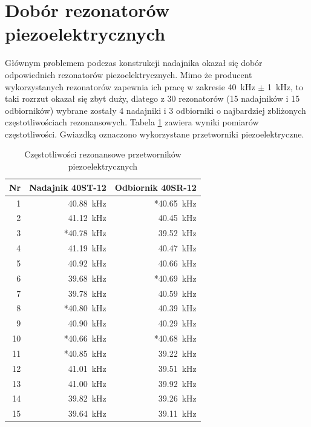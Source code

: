 \section{Dobór rezonatorów piezoelektrycznych}

Głównym problemem podczas konstrukcji nadajnika okazał się dobór odpowiednich rezonatorów piezoelektrycznych.
Mimo że producent wykorzystanych rezonatorów zapewnia ich pracę w zakresie \SI{40}{kHz} $\pm$ \SI{1}{kHz},
to taki rozrzut okazał się zbyt duży, 
dlatego z 30 rezonatorów (15 nadajników i 15 odbiorników) wybrane zostały 4 nadajniki i 3 odbiorniki o najbardziej 
zbliżonych częstotliwościach rezonansowych.
Tabela \ref{table:czestotliwosci} zawiera wyniki pomiarów częstotliwości. Gwiazdką oznaczono wykorzystane przetworniki piezoelektryczne.

\begin{table}[h]
  \caption{Częstotliwości rezonansowe przetworników piezoelektrycznych}
  \smallskip
  \label{table:czestotliwosci}
  \centering
  \begin{tabular}{|r|r|r|}
    \hline 
    Nr & Nadajnik 40ST-12 & Odbiornik 40SR-12\\
    \hline
    1  &   \SI{40,88}{kHz} & *\SI{40,65}{kHz} \\
    2  &   \SI{41,12}{kHz} &  \SI{40,45}{kHz} \\
    3  &  *\SI{40,78}{kHz} &  \SI{39,52}{kHz} \\
    4  &   \SI{41,19}{kHz} &  \SI{40,47}{kHz} \\
    5  &   \SI{40,92}{kHz} &  \SI{40,66}{kHz} \\
    6  &   \SI{39,68}{kHz} & *\SI{40,69}{kHz} \\
    7  &   \SI{39,78}{kHz} &  \SI{40,59}{kHz} \\
    8  &  *\SI{40,80}{kHz} &  \SI{40,39}{kHz} \\
    9  &   \SI{40,90}{kHz} &  \SI{40,29}{kHz} \\
    10 &  *\SI{40,66}{kHz} & *\SI{40,68}{kHz} \\
    11 &  *\SI{40,85}{kHz} &  \SI{39,22}{kHz} \\
    12 &   \SI{41,01}{kHz} &  \SI{39,51}{kHz} \\
    13 &   \SI{41,00}{kHz} &  \SI{39,92}{kHz} \\
    14 &   \SI{39,82}{kHz} &  \SI{39,26}{kHz} \\
    15 &   \SI{39,64}{kHz} &  \SI{39,11}{kHz} \\
    \hline
  \end{tabular}
\end{table}


